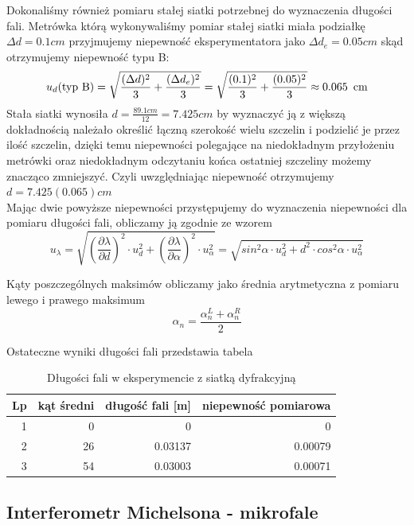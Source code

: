 \documentclass[a4paper]{article}
\begin{document}
Dokonaliśmy również pomiaru stałej siatki potrzebnej do wyznaczenia długości fali.
Metrówka którą wykonywaliśmy pomiar stałej siatki miała podziałkę $\Delta d=0.1 cm$ przyjmujemy niepewność eksperymentatora jako $\Delta d_e = 0.05cm$ skąd otrzymujemy niepewność typu B:
$$u_d (\text{typ B}) = \sqrt{\frac{(\Delta d)^2}{3} + \frac{(\Delta d_e)^2}{3}} = \sqrt{\frac{(0.1)^2}{3} + \frac{(0.05)^2}{3}} \approx 0.065 \enskip \text{cm}$$
Stała siatki wynosiła $d = \frac{89.1cm}{12} = 7.425cm$ by wyznaczyć ją z większą dokładnością należało określić łączną szerokość wielu szczelin i podzielić je przez ilość szczelin, dzięki temu niepewności polegające na niedokładnym przyłożeniu metrówki oraz niedokładnym odczytaniu końca ostatniej szczeliny możemy znacząco zmniejszyć.
Czyli uwzględniając niepewność otrzymujemy $d = 7.425(0.065)cm$
\\
Mając dwie powyższe niepewności przystępujemy do wyznaczenia niepewności dla pomiaru długości fali, obliczamy ją zgodnie ze wzorem
$$u_{\lambda} = \sqrt{(\frac{\partial \lambda}{\partial d})^2 \cdot u_d^2 + (\frac{\partial \lambda}{\partial \alpha})^2 \cdot u_{\alpha}^2} = \sqrt{sin^2 \alpha \cdot u_d^2 + d^2 \cdot cos^2 \alpha \cdot u_{\alpha}^2}$$

Kąty poszczególnych maksimów obliczamy jako średnia arytmetyczna z pomiaru lewego i prawego maksimum
$$\alpha_{n}=\frac{\alpha_{n}^L+\alpha_{n}^R}{2}$$

Ostateczne wyniki długości fali przedstawia tabela

\begin{table}[h!]
\centering
\begin{tabular}{rrrr}
\toprule
Lp &  kąt średni & długość fali [m] & niepewność pomiarowa\\
\midrule
1 & 0 & 0 & 0\\
2 & 26 & 0.03137 & 0.00079\\
3 & 54 & 0.03003 & 0.00071\\
\bottomrule
\end{tabular}
\caption{Długości fali w eksperymencie z siatką dyfrakcyjną}
\label{pomiary_michelson}
\end{table}


\subsection{Interferometr Michelsona - mikrofale}
\end{document}
